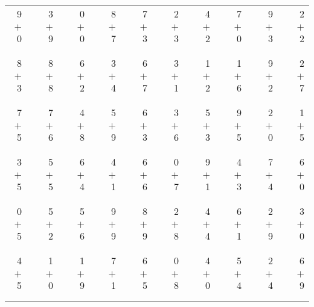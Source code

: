 \documentclass[12pt, letterpaper]{article}
\begin{document}
\begin{tabular}{rrrrrrrrrrrrrrrrrrr}
9 & & 3 & & 0 & & 8 & & 7 & & 2 & & 4 & & 7 & & 9 & & 2\\
$+$ 0 & & $+$ 9 & & $+$ 0 & & $+$ 7 & & $+$ 3 & & $+$ 3 & & $+$ 2 & & $+$ 0 & & $+$ 3 & & $+$ 2\\
\cline{1-1} \cline{3-3} \cline{5-5} \cline{7-7} \cline{9-9} \cline{11-11} \cline{13-13} \cline{15-15} \cline{17-17} \cline{19-19} \\ \\
8 & & 8 & & 6 & & 3 & & 6 & & 3 & & 1 & & 1 & & 9 & & 2\\
$+$ 3 & & $+$ 8 & & $+$ 2 & & $+$ 4 & & $+$ 7 & & $+$ 1 & & $+$ 2 & & $+$ 6 & & $+$ 2 & & $+$ 7\\
\cline{1-1} \cline{3-3} \cline{5-5} \cline{7-7} \cline{9-9} \cline{11-11} \cline{13-13} \cline{15-15} \cline{17-17} \cline{19-19} \\ \\
7 & & 7 & & 4 & & 5 & & 6 & & 3 & & 5 & & 9 & & 2 & & 1\\
$+$ 5 & & $+$ 6 & & $+$ 8 & & $+$ 9 & & $+$ 3 & & $+$ 6 & & $+$ 3 & & $+$ 5 & & $+$ 0 & & $+$ 5\\
\cline{1-1} \cline{3-3} \cline{5-5} \cline{7-7} \cline{9-9} \cline{11-11} \cline{13-13} \cline{15-15} \cline{17-17} \cline{19-19} \\ \\
3 & & 5 & & 6 & & 4 & & 6 & & 0 & & 9 & & 4 & & 7 & & 6\\
$+$ 5 & & $+$ 5 & & $+$ 4 & & $+$ 1 & & $+$ 6 & & $+$ 7 & & $+$ 1 & & $+$ 3 & & $+$ 4 & & $+$ 0\\
\cline{1-1} \cline{3-3} \cline{5-5} \cline{7-7} \cline{9-9} \cline{11-11} \cline{13-13} \cline{15-15} \cline{17-17} \cline{19-19} \\ \\
0 & & 5 & & 5 & & 9 & & 8 & & 2 & & 4 & & 6 & & 2 & & 3\\
$+$ 5 & & $+$ 2 & & $+$ 6 & & $+$ 9 & & $+$ 9 & & $+$ 8 & & $+$ 4 & & $+$ 1 & & $+$ 9 & & $+$ 0\\
\cline{1-1} \cline{3-3} \cline{5-5} \cline{7-7} \cline{9-9} \cline{11-11} \cline{13-13} \cline{15-15} \cline{17-17} \cline{19-19} \\ \\
4 & & 1 & & 1 & & 7 & & 6 & & 0 & & 4 & & 5 & & 2 & & 6\\
$+$ 5 & & $+$ 0 & & $+$ 9 & & $+$ 1 & & $+$ 5 & & $+$ 8 & & $+$ 0 & & $+$ 4 & & $+$ 4 & & $+$ 9\\
\cline{1-1} \cline{3-3} \cline{5-5} \cline{7-7} \cline{9-9} \cline{11-11} \cline{13-13} \cline{15-15} \cline{17-17} \cline{19-19} \\ \\

\end{tabular}
\end{document}
